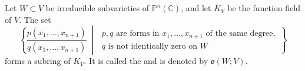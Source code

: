 Let $W \subset V$ be irreducible subvarieties of $\mathbb{P}^n(\mathbb{C})$, and let $K_V$ be the function field of $V$. The set
$$\left\{ \frac{p(x_1, \ldots, x_{n+1})}{q(x_1, \ldots, x_{n+1})} \;\middle|\;
\begin{array}{l}
p, q \text{ are forms in } x_1, \ldots, x_{n+1} \text{ of the same degree},\\
q \text{ is not identically zero on } W
\end{array}
\right\}$$
forms a subring of $K_V$. It is called the  and is denoted by $\mathfrak{o}(W; V)$.
